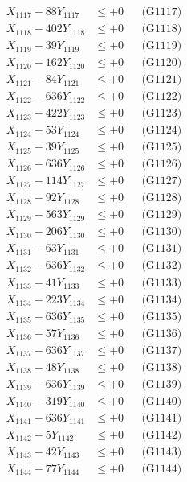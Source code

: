 \documentclass[a4paper,10pt]{article}
\begin{document}
{\begin{align}
X_{1117} - 88Y_{1117} &\leq +0 && \text{(G1117)} \\
X_{1118} - 402Y_{1118} &\leq +0 && \text{(G1118)} \\
X_{1119} - 39Y_{1119} &\leq +0 && \text{(G1119)} \\
X_{1120} - 162Y_{1120} &\leq +0 && \text{(G1120)} \\
\allowbreak
X_{1121} - 84Y_{1121} &\leq +0 && \text{(G1121)} \\
X_{1122} - 636Y_{1122} &\leq +0 && \text{(G1122)} \\
X_{1123} - 422Y_{1123} &\leq +0 && \text{(G1123)} \\
X_{1124} - 53Y_{1124} &\leq +0 && \text{(G1124)} \\
X_{1125} - 39Y_{1125} &\leq +0 && \text{(G1125)} \\
X_{1126} - 636Y_{1126} &\leq +0 && \text{(G1126)} \\
X_{1127} - 114Y_{1127} &\leq +0 && \text{(G1127)} \\
X_{1128} - 92Y_{1128} &\leq +0 && \text{(G1128)} \\
X_{1129} - 563Y_{1129} &\leq +0 && \text{(G1129)} \\
X_{1130} - 206Y_{1130} &\leq +0 && \text{(G1130)} \\
\allowbreak
X_{1131} - 63Y_{1131} &\leq +0 && \text{(G1131)} \\
X_{1132} - 636Y_{1132} &\leq +0 && \text{(G1132)} \\
X_{1133} - 41Y_{1133} &\leq +0 && \text{(G1133)} \\
X_{1134} - 223Y_{1134} &\leq +0 && \text{(G1134)} \\
X_{1135} - 636Y_{1135} &\leq +0 && \text{(G1135)} \\
X_{1136} - 57Y_{1136} &\leq +0 && \text{(G1136)} \\
X_{1137} - 636Y_{1137} &\leq +0 && \text{(G1137)} \\
X_{1138} - 48Y_{1138} &\leq +0 && \text{(G1138)} \\
X_{1139} - 636Y_{1139} &\leq +0 && \text{(G1139)} \\
X_{1140} - 319Y_{1140} &\leq +0 && \text{(G1140)} \\
\allowbreak
X_{1141} - 636Y_{1141} &\leq +0 && \text{(G1141)} \\
X_{1142} - 5Y_{1142} &\leq +0 && \text{(G1142)} \\
X_{1143} - 42Y_{1143} &\leq +0 && \text{(G1143)} \\
X_{1144} - 77Y_{1144} &\leq +0 && \text{(G1144)} \\

\end{align}}
\end{document}
